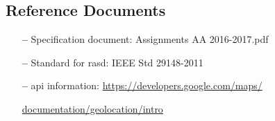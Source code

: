 \subsection{Reference Documents} \label{ref-doc}

\begin{itemize}
\item[\textbf{--}] Specification document: Assignments AA 2016-2017.pdf
\item[\textbf{--}] Standard for \acs{rasd}: IEEE Std 29148-2011
\item[\textbf{--}] \acs{api} information: 
\url{https://developers.google.com/maps/}

\url{documentation/geolocation/intro}

\end{itemize}



